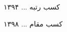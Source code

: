 



\begin{cvhonors}

  \cvhonor
    {کسب رتبه ...} %
    {۱۳۹۴} %

  \cvhonor
    {کسب مقام ...} %
    {۱۳۹۸} %


\end{cvhonors}








